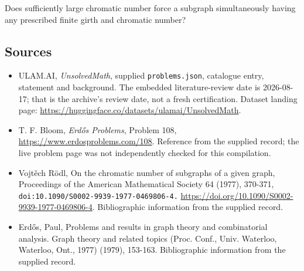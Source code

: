 \documentclass[11pt,a4paper]{article}
\begin{document}
Does sufficiently large chromatic number force a subgraph simultaneously having any prescribed finite girth and chromatic number?

\subsection{Sources}

{\small

\begin{itemize}

\item[\hypertarget{source:statement:1}{S1}] ULAM.AI, \emph{UnsolvedMath}, supplied \texttt{problems.json}, catalogue entry, statement and background. The embedded literature-review date is 2026-08-17; that is the archive’s review date, not a fresh certification. Dataset landing page: \url{https://huggingface.co/datasets/ulamai/UnsolvedMath}.

\item[\hypertarget{source:statement:2}{S2}] T. F. Bloom, \emph{Erdős Problems}, Problem 108, \url{https://www.erdosproblems.com/108}. Reference from the supplied record; the live problem page was not independently checked for this compilation.

\item[\hypertarget{source:statement:3}{S3}] Vojtěch Rödl, On the chromatic number of subgraphs of a given graph, Proceedings of the American Mathematical Society 64 (1977), 370-371, \nolinkurl{doi:10.1090/S0002-9939-1977-0469806-4.} \url{https://doi.org/10.1090/S0002-9939-1977-0469806-4}. Bibliographic information from the supplied record.

\item[\hypertarget{source:statement:4}{S4}] Erd\H{o}s, Paul, Problems and results in graph theory and combinatorial analysis. Graph theory and related topics (Proc. Conf., Univ. Waterloo, Waterloo, Ont., 1977) (1979), 153-163. Bibliographic information from the supplied record.

\end{itemize}

}

\label{end:statement}
\end{document}
